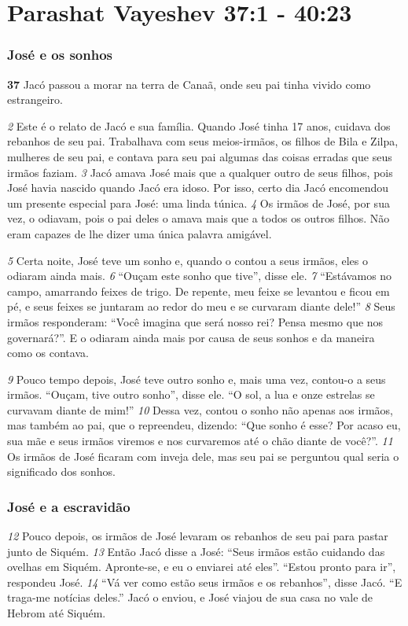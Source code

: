 \section*{Parashat Vayeshev 37:1 - 40:23}


\subsubsection*{José e os sonhos}
\textbf{\large 37} Jacó passou a morar na terra de Canaã, onde seu pai tinha vivido como
estrangeiro. 

\bigskip
\textit{\tiny 2}
Este é o relato de Jacó e sua família. Quando José tinha 17 anos, cuidava dos
rebanhos de seu pai. Trabalhava com seus meios-irmãos, os filhos de Bila e Zilpa,
mulheres de seu pai, e contava para seu pai algumas das coisas erradas que seus
irmãos faziam. 
\textit{\tiny 3}
Jacó
 amava José mais que a qualquer outro de seus filhos, pois José havia
nascido quando Jacó era idoso. Por isso, certo dia Jacó encomendou um presente
especial para José: uma linda túnica. 
\textit{\tiny 4}
Os irmãos de José, por sua vez, o odiavam,
pois o pai deles o amava mais que a todos os outros filhos. Não eram capazes de
lhe dizer uma única palavra amigável. 

\bigskip
\textit{\tiny 5}
Certa noite, José teve um sonho e, quando o contou a seus irmãos, eles o
odiaram ainda mais. 
\textit{\tiny 6}
“Ouçam este sonho que tive”, disse ele. 
\textit{\tiny 7}
“Estávamos no campo, amarrando feixes de trigo. De repente, meu feixe se levantou e ficou em
pé, e seus feixes se juntaram ao redor do meu e se curvaram diante dele!” 
\textit{\tiny 8}
Seus irmãos responderam: “Você imagina que será nosso rei? Pensa mesmo
que nos governará?”. E o odiaram ainda mais por causa de seus sonhos e da
maneira como os contava. 

\bigskip
\textit{\tiny 9}
Pouco tempo depois, José teve outro sonho e, mais uma vez, contou-o a seus
irmãos. “Ouçam, tive outro sonho”, disse ele. “O sol, a lua e onze estrelas se
curvavam diante de mim!”
\textit{\tiny 10}
Dessa vez, contou o sonho não apenas aos irmãos, mas também ao pai, que o
repreendeu, dizendo: “Que sonho é esse? Por acaso eu, sua mãe e seus irmãos
viremos e nos curvaremos até o chão diante de você?”. 
\textit{\tiny 11}
Os irmãos de José
ficaram com inveja dele, mas seu pai se perguntou qual seria o significado dos
sonhos.

\bigskip
\subsubsection*{José e a escravidão}
\textit{\tiny 12}
Pouco depois, os irmãos de José levaram os rebanhos de seu pai para pastar
junto de Siquém. 
\textit{\tiny 13}
Então Jacó disse a José: “Seus irmãos estão cuidando das
ovelhas em Siquém. Apronte-se, e eu o enviarei até eles”.
   “Estou pronto para ir”, respondeu José.
\textit{\tiny 14}
“Vá ver como estão seus irmãos e os rebanhos”, disse Jacó. “E traga-me
notícias deles.” Jacó o enviou, e José viajou de sua casa no vale de Hebrom até
Siquém.
   
